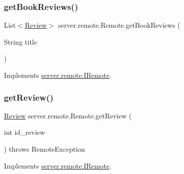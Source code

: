 \mbox{\label{classserver_1_1remote_1_1_remote_a501e5c5fe847917c9615f0772864a147}} 
\subsubsection{\texorpdfstring{get\+Book\+Reviews()}{getBookReviews()}}
{\footnotesize\ttfamily List$<$\hyperlink{classserver_1_1data_1_1_review}{Review}$>$ server.\+remote.\+Remote.\+get\+Book\+Reviews (\begin{DoxyParamCaption}\item[{String}]{title }\end{DoxyParamCaption})}



Implements \hyperlink{interfaceserver_1_1remote_1_1_i_remote_a600254593b70d9757190475d3435b390}{server.\+remote.\+I\+Remote}.

\mbox{\label{classserver_1_1remote_1_1_remote_a98bd7181568c637a6cbcc0b72ebb9f95}} 
\subsubsection{\texorpdfstring{get\+Review()}{getReview()}}
{\footnotesize\ttfamily \hyperlink{classserver_1_1data_1_1_review}{Review} server.\+remote.\+Remote.\+get\+Review (\begin{DoxyParamCaption}\item[{int}]{id\+\_\+review }\end{DoxyParamCaption}) throws Remote\+Exception}



Implements \hyperlink{interfaceserver_1_1remote_1_1_i_remote_a7b3462a438579c85dc7f097acf9cec41}{server.\+remote.\+I\+Remote}.

\mbox{\label{classserver_1_1remote_1_1_remote_abef8350014445d8f2d5ffb4c088e82b6}} 

